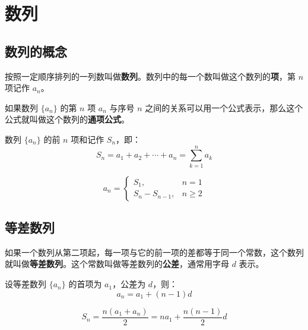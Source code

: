 \chapter{数列}

\section{数列的概念}

\begin{definition}[数列]
按照一定顺序排列的一列数叫做\textbf{数列}。数列中的每一个数叫做这个数列的\textbf{项}，第 $n$ 项记作 $a_n$。
\end{definition}

\begin{definition}[数列的通项公式]
如果数列 $\{a_n\}$ 的第 $n$ 项 $a_n$ 与序号 $n$ 之间的关系可以用一个公式表示，那么这个公式就叫做这个数列的\textbf{通项公式}。
\end{definition}

\begin{definition}[数列的前 $n$ 项和]
数列 $\{a_n\}$ 的前 $n$ 项和记作 $S_n$，即：
\[ S_n = a_1 + a_2 + \cdots + a_n = \sum_{k=1}^{n} a_k \]
\end{definition}

\begin{theorem}
\[ a_n = \begin{cases} S_1, & n = 1 \\ S_n - S_{n-1}, & n \geq 2 \end{cases} \]
\end{theorem}

\section{等差数列}

\begin{definition}[等差数列]
如果一个数列从第二项起，每一项与它的前一项的差都等于同一个常数，这个数列就叫做\textbf{等差数列}。这个常数叫做等差数列的\textbf{公差}，通常用字母 $d$ 表示。
\end{definition}

\begin{theorem}[等差数列的通项公式]
设等差数列 $\{a_n\}$ 的首项为 $a_1$，公差为 $d$，则：
\[ a_n = a_1 + (n-1)d \]
\end{theorem}

\begin{theorem}
\[ S_n = \frac{n(a_1 + a_n)}{2} = na_1 + \frac{n(n-1)}{2}d \]
\end{theorem}

